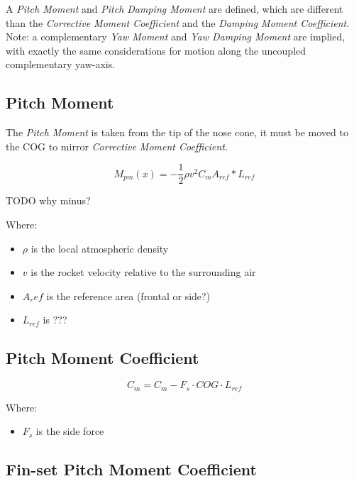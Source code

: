\documentclass[]{book}
\providecommand{\tightlist}{%
  \setlength{\itemsep}{0pt}\setlength{\parskip}{0pt}}
\begin{document}
A \emph{Pitch Moment} and \emph{Pitch Damping Moment} are defined, which
are different than the \emph{Corrective Moment Coefficient} and the
\emph{Damping Moment Coefficient}. Note: a complementary \emph{Yaw
Moment} and \emph{Yaw Damping Moment} are implied, with exactly the same
considerations for motion along the uncoupled complementary yaw-axis.

\subsection{Pitch Moment}\label{pitch-moment}

The \emph{Pitch Moment} is taken from the tip of the nose cone, it must
be moved to the COG to mirror \emph{Corrective Moment Coefficient}.

\begin{equation}
\label{eq_pitching_moment}
M_{pm}(x) = - \dfrac{1}{2} \rho v^2 C_m A_{ref} * L_{ref}
\end{equation}

TODO why minus?

Where:

\begin{itemize}
\tightlist
\item
  \(\rho\) is the local atmospheric density
\item
  \(v\) is the rocket velocity relative to the surrounding air
\item
  \(A_ref\) is the reference area (frontal or side?)
\item
  \(L_{ref}\) is ???
\end{itemize}

\subsection{Pitch Moment Coefficient}\label{pitch-moment-coefficient}

\begin{equation}
\label{eq_pitch_moment}
C_m = C_m - F_s \cdot COG \cdot L_{ref} 
\end{equation}

Where:

\begin{itemize}
\tightlist
\item
  \(F_s\) is the side force
\end{itemize}

\subsection{Fin-set Pitch Moment
Coefficient}\label{fin-set-pitch-moment-coefficient}
\end{document}
